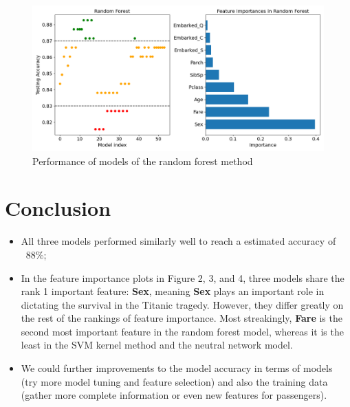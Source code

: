\begin{figure}[H]
    \centering
    \includegraphics[width=140mm]{RF.png}
    \caption{Performance of models of the random forest method}
    \label{RF}
\end{figure} 

\section*{\textbf{Conclusion}} 
\begin{itemize}
    \item All three models performed similarly well to reach a estimated accuracy of ~88\%;
    \item In the feature importance plots in Figure 2, 3, and 4, three models share the rank 1 important feature: \textbf{Sex}, meaning \textbf{Sex} plays an important role in dictating the survival in the Titanic tragedy. However, they differ greatly on the rest of the rankings of feature importance. Most streakingly, \textbf{Fare} is the second most important feature in the random forest model, whereas it is the least in the SVM kernel method and the neutral network model.
    \item We could further improvements to the model accuracy in terms of models (try more model tuning and feature selection) and also the training data (gather more complete information or even new features for passengers).
\end{itemize}
